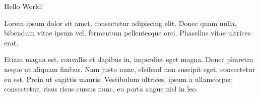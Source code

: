 \documentclass{article}
\begin{document}
Hello World!

Lorem ipsum dolor sit amet, consectetur adipiscing elit. Donec quam
nulla, bibendum vitae ipsum vel, fermentum pellentesque orci.
Phasellus vitae ultrices erat.



Etiam magna                      est, convallis et dapibus
in, imperdiet eget magna. Donec pharetra neque ut aliquam finibus. Nam
justo nunc, eleifend non suscipit eget, consectetur eu est. Proin ut
sagittis mauris. Vestibulum ultrices, ipsum a ullamcorper consectetur,
risus risus cursus nunc, eu porta augue nisl in leo.
\end{document}
